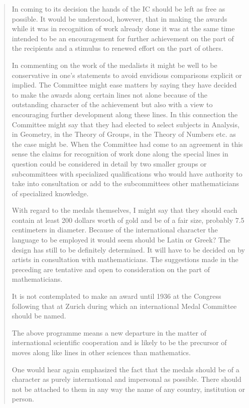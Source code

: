 \begin{quote}
  In coming to its decision the hands of the IC should be left as free
  as possible. It would be understood, however, that in making the
  awards while it was in recognition of work already done it was at the
  same time intended to be an encouragement for further achievement on
  the part of the recipients and a stimulus to renewed effort on the
  part of others.

  In commenting on the work of the medalists it might be well to be
  conservative in one's statements to avoid envidious comparisons
  explicit or implied. The Committee might ease matters by saying they
  have decided to make the awards along certain lines not alone because
  of the outstanding character of the achievement but also with a view
  to encouraging further development along these lines. In this
  connection the Committee might say that they had elected to select
  subjects in Analysis, in Geometry, in the Theory of Groups, in the
  Theory of Numbers etc. as the case might be. When the Committee had
  come to an agreement in this sense the claims for recognition of work
  done along the special lines in question could be considered in detail
  by two smaller groups or subcommittees with specialized qualifications
  who would have authority to take into consultation or add to the
  subcommittees other mathematicians of specialized knowledge.

  With regard to the medals themselves, I might say that they should
  each contain at least 200 dollars worth of gold and be of a fair size,
  probably 7.5 centimeters in diameter. Because of the international
  character the language to be employed it would seem should be Latin or
  Greek? The design has still to be definitely determined. It will have
  to be decided on by artists in consultation with mathematicians. The
  suggestions made in the preceding are tentative and open to
  consideration on the part of mathematicians.

  It is not contemplated to make an award until 1936 at the Congress
  following that at Zurich during which an international Medal Committee
  should be named.

  The above programme means a new departure in the matter of
  international scientific cooperation and is likely to be the precursor
  of moves along like lines in other sciences than mathematics.

  One would hear again emphasized the fact that the medals should be of
  a character as purely international and impersonal as possible. There
  should not be attached to them in any way the name of any country,
  institution or person.


\end{quote}
